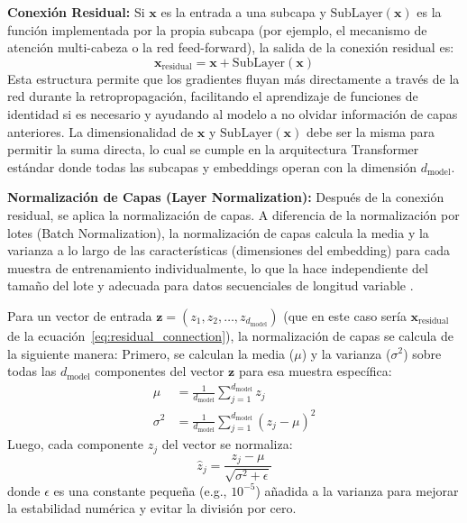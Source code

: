 \textbf{Conexión Residual:}
Si $\mathbf{x}$ es la entrada a una subcapa y $\text{SubLayer}(\mathbf{x})$ es la función implementada por la propia subcapa (por ejemplo, el mecanismo de atención multi-cabeza o la red feed-forward), la salida de la conexión residual es:
\begin{equation}
\mathbf{x}_{\text{residual}} = \mathbf{x} + \text{SubLayer}(\mathbf{x})
\label{eq:residual_connection}
\end{equation}
Esta estructura permite que los gradientes fluyan más directamente a través de la red durante la retropropagación, facilitando el aprendizaje de funciones de identidad si es necesario y ayudando al modelo a no olvidar información de capas anteriores. La dimensionalidad de $\mathbf{x}$ y $\text{SubLayer}(\mathbf{x})$ debe ser la misma para permitir la suma directa, lo cual se cumple en la arquitectura Transformer estándar donde todas las subcapas y embeddings operan con la dimensión $d_{\text{model}}$.

\textbf{Normalización de Capas (Layer Normalization):}
Después de la conexión residual, se aplica la normalización de capas. A diferencia de la normalización por lotes (Batch Normalization), la normalización de capas calcula la media y la varianza a lo largo de las características (dimensiones del embedding) para cada muestra de entrenamiento individualmente, lo que la hace independiente del tamaño del lote y adecuada para datos secuenciales de longitud variable \citep{Ba2016layer}.

Para un vector de entrada $\mathbf{z} = (z_1, z_2, \ldots, z_{d_{\text{model}}})$ (que en este caso sería $\mathbf{x}_{\text{residual}}$ de la ecuación~\ref{eq:residual_connection}), la normalización de capas se calcula de la siguiente manera:
Primero, se calculan la media ($\mu$) y la varianza ($\sigma^2$) sobre todas las $d_{\text{model}}$ componentes del vector $\mathbf{z}$ para esa muestra específica:
\begin{align}
\mu &= \frac{1}{d_{\text{model}}} \sum_{j=1}^{d_{\text{model}}} z_j \label{eq:ln_mean} \\
\sigma^2 &= \frac{1}{d_{\text{model}}} \sum_{j=1}^{d_{\text{model}}} (z_j - \mu)^2 \label{eq:ln_variance}
\end{align}
Luego, cada componente $z_j$ del vector se normaliza:
\begin{equation}
\hat{z}_j = \frac{z_j - \mu}{\sqrt{\sigma^2 + \epsilon}}
\label{eq:ln_normalize}
\end{equation}
donde $\epsilon$ es una constante pequeña (e.g., $10^{-5}$) añadida a la varianza para mejorar la estabilidad numérica y evitar la división por cero.

